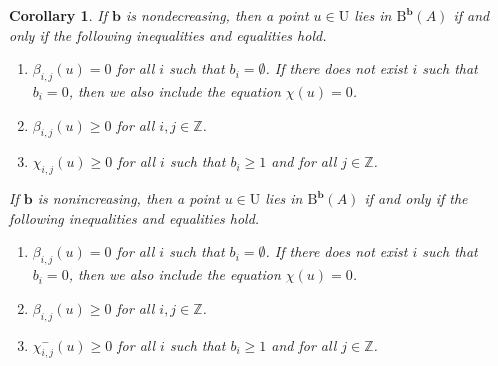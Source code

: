 \documentclass[12pt]{amsart}
\newtheorem{cor}[lemma]{Corollary}
\theoremstyle{definition}
\theoremstyle{remark}
\newcommand{\ZZ}{\mathbb{Z}}
\newcommand{\UU}{\mathrm{U}}
\newcommand{\bb}{\mathbf{b}}
\newcommand{\BBQ}{\mathrm{B}}
\begin{document}
\begin{cor}\label{cor:dualconeA refined}
If $\bb$ is nondecreasing, then a point $u\in \UU$ lies in $\BBQ^{\bb}(A)$ if and only if the following inequalities and equalities hold.
\begin{enumerate}
	\item $\beta_{i,j}(u)=0$ for all $i$ such that $b_i=\emptyset$.  If there does not exist $i$ such that $b_i=0$, then we also include the equation $\chi(u)=0$.
	\item $\beta_{i,j}(u)\geq 0$ for all $i,j\in \ZZ$.
	\item  $\chi_{i,j}(u)\geq 0$ for all $i$ such that $b_i\geq 1$ and for all $j\in \ZZ$.
\end{enumerate}
If $\bb$ is nonincreasing, then a point $u\in \UU$ lies in $\BBQ^{\bb}(A)$ if and only if the following inequalities and equalities hold.
\begin{enumerate}
	\item $\beta_{i,j}(u)=0$ for all $i$ such that $b_i=\emptyset$.  If there does not exist $i$ such that $b_i=0$, then we also include the equation $\chi(u)=0$.
	\item $\beta_{i,j}(u)\geq 0$ for all $i,j\in \ZZ$.
	\item  $\chi^{-}_{i,j}(u)\geq 0$ for all $i$ such that $b_i\geq 1$ and for all $j\in \ZZ$.
\end{enumerate}
\end{cor}
\end{document}

